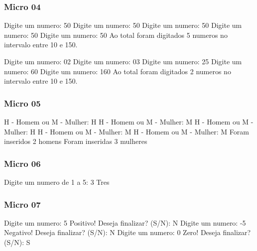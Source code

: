 \documentclass[12pt,a4paper,twoside]{report}
\begin{document}
\subsubsection{Micro 04}


\begin{terminal}
Digite um numero: 50
Digite um numero: 50
Digite um numero: 50
Digite um numero: 50
Digite um numero: 50
Ao total foram digitados 5 numeros no intervalo entre 10 e 150.

Digite um numero: 02
Digite um numero: 03
Digite um numero: 25
Digite um numero: 60
Digite um numero: 160
Ao total foram digitados 2 numeros no intervalo entre 10 e 150.
\end{terminal}

\subsubsection{Micro 05}


\begin{terminal}
H - Homem ou M - Mulher: H
H - Homem ou M - Mulher: M
H - Homem ou M - Mulher: H
H - Homem ou M - Mulher: M
H - Homem ou M - Mulher: M
Foram inseridos 2 homens
Foram inseridas 3 mulheres
\end{terminal}

\subsubsection{Micro 06}


\begin{terminal}
Digite um numero de 1 a 5: 3
Tres
\end{terminal}

\subsubsection{Micro 07}


\begin{terminal}
Digite um numero: 5
Positivo!
Deseja finalizar? (S/N): N
Digite um numero: -5
Negativo!
Deseja finalizar? (S/N): N
Digite um numero: 0
Zero!
Deseja finalizar? (S/N): S
\end{terminal}
\end{document}
